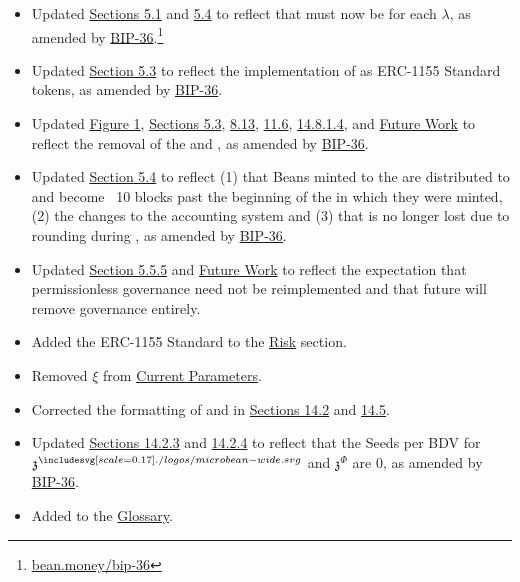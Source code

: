 \documentclass[class=article, crop=false]{standalone}
\begin{document}
\begin{itemize}[topsep=0pt, itemsep=3pt,leftmargin=16pt]
\begin{itemize}
        \item Updated \hyperlink{subsection.5.1}{Sections 5.1} and \hyperlink{subsection.5.4}{5.4} to reflect that   must now be  for each \hyperlink{ht126}{$\lambda$}, as amended by \href{https://bean.money/bip-36}{BIP-36}.\footnote{\href{https://bean.money/bip-36}{bean.money/bip-36}}
        \item Updated \hyperlink{subsection.5.3}{Section 5.3} to reflect the implementation of  as ERC-1155 Standard tokens, as amended by \href{https://bean.money/bip-36}{BIP-36}.
        \item Updated \hyperref[fig 1]{Figure 1}, \hyperlink{subsection.5.3}{Sections 5.3}, \hyperlink{subsection.8.13}{8.13}, \hyperlink{subsection.11.6}{11.6}, \hyperlink{subsubsubsection.14.8.1.4}{14.8.1.4}, and \hyperlink{section.13}{Future Work} to reflect the removal of the  and , as amended by \href{https://bean.money/bip-36}{BIP-36}.
        \item Updated \hyperlink{subsection.5.4}{Section 5.4} to reflect (1) that Beans minted to the  are distributed to  and become  \Bean\ 10 blocks past the beginning of the  in which they were minted, (2) the changes to the  accounting system and (3) that  is no longer lost due to rounding during , as amended by \href{https://bean.money/bip-36}{BIP-36}.
        \item Updated \hyperlink{subsubsection.5.5.5}{Section 5.5.5} and \hyperlink{section.13}{Future Work} to reflect the expectation that permissionless governance need not be reimplemented and that future  will remove governance entirely. 
        \item Added the ERC-1155 Standard to the \hyperlink{section.12}{Risk} section.
        \item Removed $\xi$ from \hyperlink{subsection.14.1}{Current Parameters}.
        \item Corrected the formatting of  and  in \hyperlink{subsection.14.2}{Sections 14.2} and \hyperlink{subsection.14.5}{14.5}.
        \item Updated \hyperlink{subsubsection.14.2.3}{Sections 14.2.3} and \hyperlink{subsubsection.14.2.4}{14.2.4} to reflect that the Seeds per BDV for $\mathfrak{z}^{\bean}$ and $\mathfrak{z}^{\Phi}$ are 0, as amended by \href{https://bean.money/bip-36}{BIP-36}.
        \item Added  to the \hyperlink{subsection.14.11}{Glossary}. 

\end{itemize}
\end{itemize}
\end{document}

